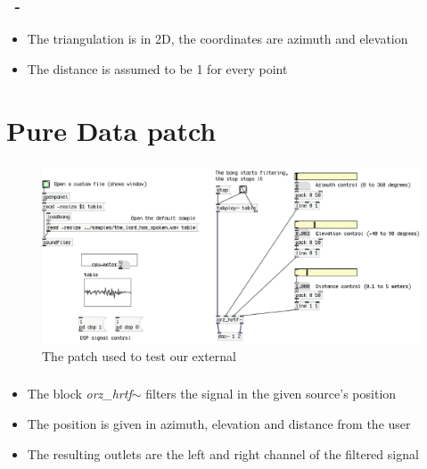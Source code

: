\documentclass{beamer}
\begin{document}
	\begin{frame}
		\frametitle{\insertsection\ - \insertsubsection}
		\begin{itemize}
			\item The triangulation is in 2D, the coordinates are azimuth and elevation
			\item The distance is assumed to be 1 for every point
		\end{itemize}
	\end{frame}

	\section{Pure Data patch}

	\begin{frame}
		\frametitle{\insertsection}
		\begin{figure}
			\centering
			  \includegraphics[width=1.0\textwidth]{images/Test_patch.png}
			  \caption{The patch used to test our external}
			  \label{fig:test}
		\end{figure}
	\end{frame}
	
	\begin{frame}
		\frametitle{\insertsection}
		\begin{itemize}
          \item The block {\em orz\_hrtf$\sim$} filters the signal in the given source's position
			\item The position is given in azimuth, elevation and distance from the user
			\item The resulting outlets are the left and right channel of the filtered signal
		\end{itemize}
	\end{frame}
\end{document}
